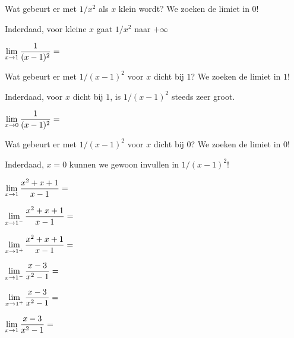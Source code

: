 \documentclass{ximera}
\begin{document}
\begin{exercise}
\begin{question}
			\begin{feedback}[attempt]Wat gebeurt er met $1/x^2$ als $x$ klein wordt? We zoeken de limiet in $0$!
            \end{feedback}
			\begin{feedback}[correct]Inderdaad, voor kleine $x$  gaat $1/x^2$ naar $+\infty$
			\end{feedback}	
		\end{question}
		\begin{question} \def\isA{correct}   $\limxg{1}    \frac{1}{(x-1)^2}= \;$   \localoefoptions 
            \begin{feedback}[attempt]Wat gebeurt er met $1/(x-1)^2$ voor $x$ dicht bij $1$? We zoeken de limiet in $1$!
            \end{feedback}          
			\begin{feedback}[correct]Inderdaad, voor $x$ dicht bij $1$, is $1/(x-1)^2$ steeds zeer groot.
			\end{feedback}	
		\end{question}
		\begin{question} \def\isD{correct}   $\limx    \frac{1}{(x-1)^2}= \;$   \localoefoptions 
			\begin{feedback}[attempt]Wat gebeurt er met $1/(x-1)^2$ voor $x$ dicht bij $0$? We zoeken de limiet in $0$!
            \end{feedback}
			\begin{feedback}[correct]Inderdaad, $x=0$ kunnen we gewoon invullen in $1/(x-1)^2$!
			\end{feedback}	
		\end{question}
		\begin{question} \def\isE{correct}   $\limxg{1}    \dfrac{x^2+x+1}{x-1}= \;$            \localoefoptions \end{question}
		\begin{question} \def\isB{correct}   $\llimxg{1}    \dfrac{x^2+x+1}{x-1}= \;$            \localoefoptions \end{question}
		\begin{question} \def\isA{correct}   $\rlimxg{1}    \dfrac{x^2+x+1}{x-1}= \;$            \localoefoptions \end{question}
		\begin{question} \def\isA{correct}   $\llimxg{1}    \dfrac{x-3}{x^2-1}= \;$            \localoefoptions \end{question}
		\begin{question} \def\isB{correct}   $\rlimxg{1}    \dfrac{x-3}{x^2-1}= \;$            \localoefoptions \end{question}
		\begin{question} \def\isE{correct}   $\limxg{1}    \dfrac{x-3}{x^2-1}= \;$            \localoefoptions \end{question}
				
\end{exercise}
\end{document}
